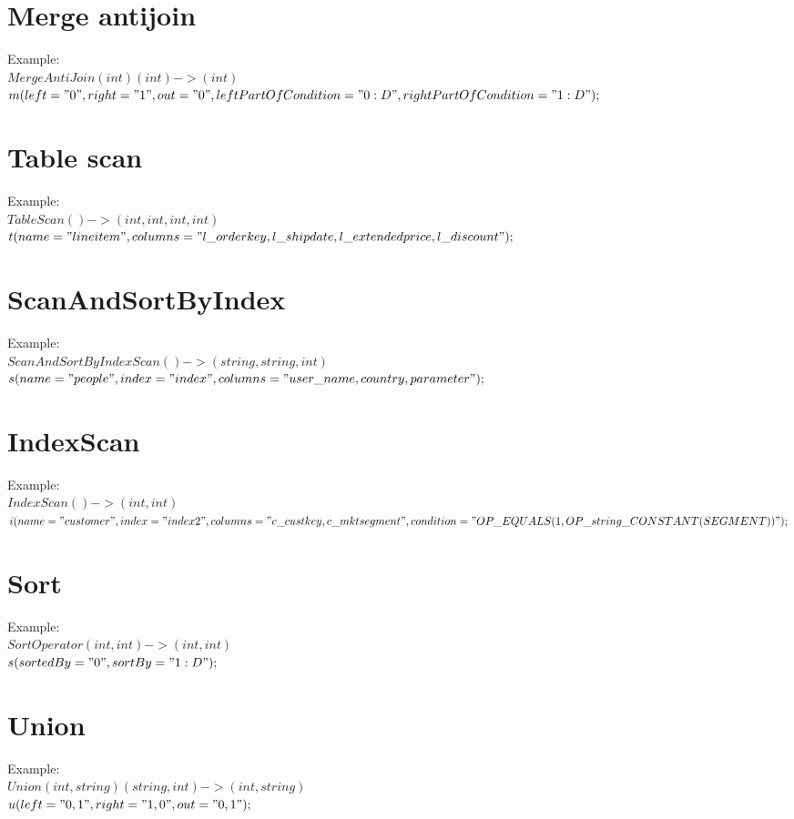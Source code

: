 \documentclass{article}
\begin{document}
\section{Merge antijoin}
Example:\\
$MergeAntiJoin(int)(int)->(int)$\\
$m(left="0",right="1",out="0",leftPartOfCondition="0:D",rightPartOfCondition="1:D");$\\ 


\section{Table scan}
Example:\\
$TableScan()->(int,int,int,int)$\\
$t(name="lineitem",columns="l\_orderkey,l\_shipdate,l\_extendedprice,l\_discount");$\\ 


\section{ScanAndSortByIndex}
Example:\\
$ScanAndSortByIndexScan()->(string,string,int)$\\
$s(name="people",index="index",columns="user\_name,country,parameter"); $\\ 

\section{IndexScan}
Example:\\
$IndexScan()->(int,int)$\\
$i(name="customer",index="index2",columns="c\_custkey,c\_mktsegment",condition="OP\_EQUALS(1,OP\_string\_CONSTANT(SEGMENT))");$

\section{Sort}
Example:\\
$SortOperator(int,int)->(int,int)$\\
$s(sortedBy="0",sortBy="1:D");$\\

\section{Union}
Example:\\
$Union(int,string)(string,int)->(int,string)$\\
$ u(left="0,1",right="1,0",out="0,1");$\\
\end{document}
